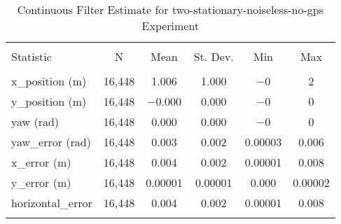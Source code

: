 
\begin{table}[h] \centering 
  \caption{Continuous Filter Estimate for two-stationary-noiseless-no-gps Experiment} 
  \label{tab:two_stationary_noiseless_no_gps_continuous_summary} 
\begin{tabular}{@{\extracolsep{5pt}}lccccc} 
\\[-1.8ex]\hline 
\hline \\[-1.8ex] 
Statistic & \multicolumn{1}{c}{N} & \multicolumn{1}{c}{Mean} & \multicolumn{1}{c}{St. Dev.} & \multicolumn{1}{c}{Min} & \multicolumn{1}{c}{Max} \\ 
\hline \\[-1.8ex] 
x\_position (m) & 16,448 & \num{1.006} & \num{1.000} & $-$0 & 2 \\ 
y\_position (m) & 16,448 & \num{-0.000} & \num{0.000} & $-$0 & 0 \\ 
yaw (rad) & 16,448 & \num{0.000} & \num{0.000} & $-$0 & 0 \\ 
yaw\_error (rad) & 16,448 & \num{0.003} & \num{0.002} & \num{0.00003} & \num{0.006} \\ 
x\_error (m) & 16,448 & \num{0.004} & \num{0.002} & \num{0.00001} & \num{0.008} \\ 
y\_error (m) & 16,448 & \num{0.00001} & \num{0.00001} & \num{0.000} & \num{0.00002} \\ 
horizontal\_error & 16,448 & \num{0.004} & \num{0.002} & \num{0.00001} & \num{0.008} \\ 
\hline \\[-1.8ex] 
\end{tabular} 
\end{table} 
